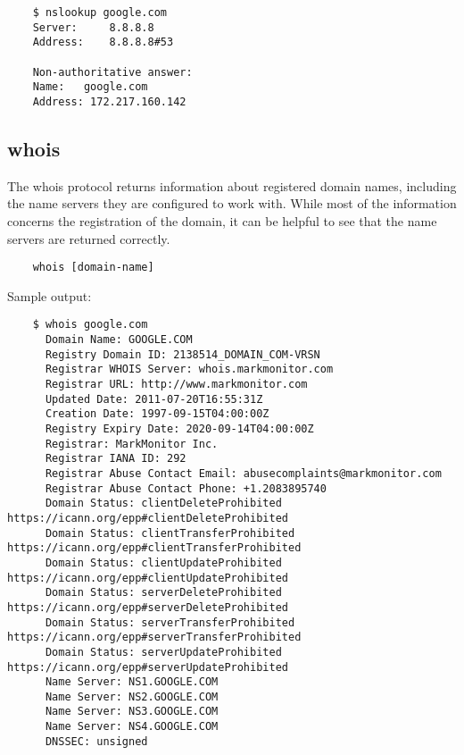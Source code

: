 \documentclass[a4paper,12pt]{article}
\begin{document}
    \begin{verbatim}
    $ nslookup google.com
    Server:		8.8.8.8
    Address:	8.8.8.8#53
    
    Non-authoritative answer:
    Name:	google.com
    Address: 172.217.160.142
    \end{verbatim}
    
    \subsection{whois}
    The whois protocol returns information about registered domain names, including the name servers they are configured to work with.
    While most of the information concerns the registration of the domain, it can be helpful to see that the name servers are returned correctly.
    
    
    \begin{verbatim}
    whois [domain-name]
    \end{verbatim}
    
    Sample output:
    
    \begin{verbatim}
    $ whois google.com
      Domain Name: GOOGLE.COM
      Registry Domain ID: 2138514_DOMAIN_COM-VRSN
      Registrar WHOIS Server: whois.markmonitor.com
      Registrar URL: http://www.markmonitor.com
      Updated Date: 2011-07-20T16:55:31Z
      Creation Date: 1997-09-15T04:00:00Z
      Registry Expiry Date: 2020-09-14T04:00:00Z
      Registrar: MarkMonitor Inc.
      Registrar IANA ID: 292
      Registrar Abuse Contact Email: abusecomplaints@markmonitor.com
      Registrar Abuse Contact Phone: +1.2083895740
      Domain Status: clientDeleteProhibited https://icann.org/epp#clientDeleteProhibited
      Domain Status: clientTransferProhibited https://icann.org/epp#clientTransferProhibited
      Domain Status: clientUpdateProhibited https://icann.org/epp#clientUpdateProhibited
      Domain Status: serverDeleteProhibited https://icann.org/epp#serverDeleteProhibited
      Domain Status: serverTransferProhibited https://icann.org/epp#serverTransferProhibited
      Domain Status: serverUpdateProhibited https://icann.org/epp#serverUpdateProhibited
      Name Server: NS1.GOOGLE.COM
      Name Server: NS2.GOOGLE.COM
      Name Server: NS3.GOOGLE.COM
      Name Server: NS4.GOOGLE.COM
      DNSSEC: unsigned
    \end{verbatim}
    
    \begin{verbatim}
    
    \end{verbatim}
    
\end{document}
